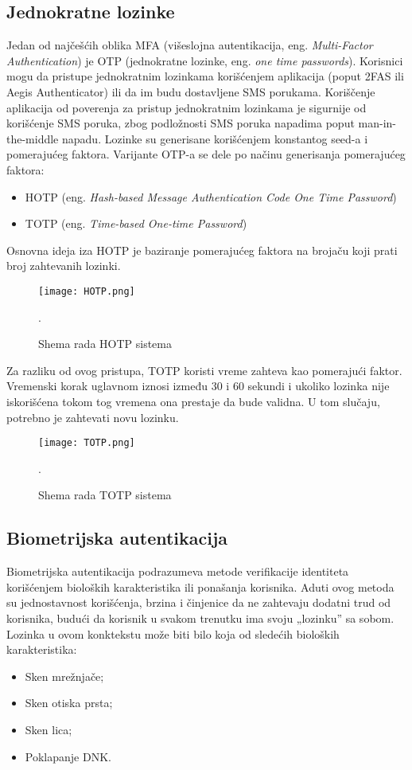 \documentclass[fleqn, 12pt]{article}
\begin{document}
\subsection{Jednokratne lozinke}
Jedan od najčešćih oblika MFA (višeslojna autentikacija, eng. \emph{Multi-Factor Authentication}) je OTP (jednokratne lozinke, eng. \emph{one time passwords}). Korisnici mogu da pristupe jednokratnim lozinkama korišćenjem aplikacija (poput 2FAS ili Aegis Authenticator) ili da im budu dostavljene SMS porukama. Koriščenje aplikacija od poverenja za pristup jednokratnim lozinkama je sigurnije od korišćenje SMS poruka, zbog podložnosti SMS poruka napadima poput man-in-the-middle napadu. Lozinke su generisane korišćenjem konstantog seed-a i pomerajućeg faktora. Varijante OTP-a se dele po načinu generisanja pomerajućeg faktora:
\begin{itemize}
    \item HOTP (eng. \emph{Hash-based Message Authentication Code One Time Password})
    \item TOTP (eng. \emph{Time-based One-time Password})
\end{itemize}

Osnovna ideja iza HOTP je baziranje pomerajućeg faktora na brojaču koji prati broj zahtevanih lozinki. 

\begin{figure}[H]
    \centering
    \texttt{[image: HOTP.png]}
    \caption{Shema rada HOTP sistema\cite{OTP}}.
    \label{fig:enter-label}
\end{figure}

Za razliku od ovog pristupa, TOTP koristi vreme zahteva kao pomerajući faktor. Vremenski korak uglavnom iznosi između 30 i 60 sekundi i ukoliko lozinka nije iskorišćena tokom tog vremena ona prestaje da bude validna. U tom slučaju, potrebno je zahtevati novu lozinku\cite{OTP}. 

\begin{figure}[H]
    \centering
    \texttt{[image: TOTP.png]}
    \caption{Shema rada TOTP sistema\cite{OTP}}.
    \label{fig:enter-label}
\end{figure}

\newpage
\subsection{Biometrijska autentikacija}
\indent Biometrijska autentikacija podrazumeva metode verifikacije identiteta korišćenjem bioloških karakteristika ili ponašanja korisnika. Aduti ovog metoda su jednostavnost korišćenja, brzina i činjenice da ne zahtevaju dodatni trud od korisnika, budući da korisnik u svakom trenutku ima svoju „lozinku'' sa sobom. Lozinka u ovom konktekstu može biti bilo koja od sledećih bioloških karakteristika:
\begin{itemize}
    \item Sken mrežnjače;
    \item Sken otiska prsta;
    \item Sken lica;
    \item Poklapanje DNK. 
\end{itemize}
\end{document}
